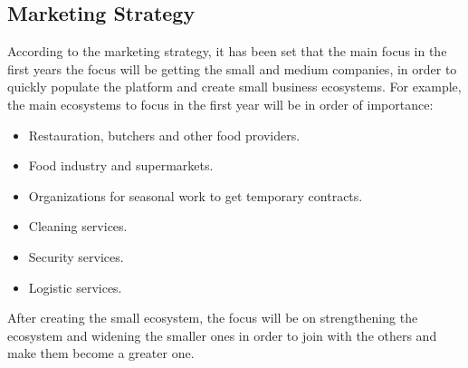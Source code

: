 \subsection{Marketing Strategy}
According to the marketing strategy, it has been set that the main focus in the first years the focus will be getting the small and medium companies, in order to quickly populate the platform and create small business ecosystems. For example, the main ecosystems to focus in the first year will be in order of importance:
\begin{itemize}
	\item Restauration, butchers and other food providers.
	\item Food industry and supermarkets.
	\item Organizations for seasonal work to get temporary contracts.
	\item Cleaning services.
	\item Security services.
	\item Logistic services.
\end{itemize}
After creating the small ecosystem, the focus will be on strengthening the ecosystem and widening the smaller ones in order to join with the others and make them become a greater one.
